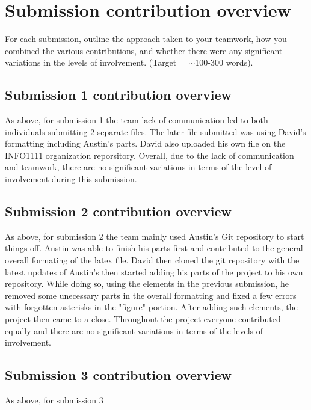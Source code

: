 \documentclass[a4paper, 11pt]{report}
\begin{document}

\newpage
\section{Submission contribution overview}

For each submission, outline the approach taken to your teamwork, how you combined the various contributions, and whether there were any significant variations in the levels of involvement. (Target = $\sim$100-300 words).

\subsection{Submission 1 contribution overview}

As above, for submission 1 the team lack of communication led to both individuals submitting 2 separate files. The later file submitted was using David's formatting including Austin's parts. David also uploaded his own file on the INFO1111 organization reporsitory. Overall, due to the lack of communication and teamwork, there are no significant variations in terms of the level of involvement during this submission. 
\subsection{Submission 2 contribution overview}


As above, for submission 2 the team mainly used Austin's Git repository to start things off. Austin was able to finish his parts first and contributed to the general overall formating of the latex file. David then cloned the git repository with the latest updates of Austin's then started adding his parts of the project to his own repository. While doing so, using the elements in the previous submission, he removed some unecessary parts in the overall formatting and fixed a few errors with forgotten asterisks in the "figure" portion. After adding such elements, the project then came to a close. Throughout the project everyone contributed equally and there are no significant variations in terms of the levels of involvement. 

\subsection{Submission 3 contribution overview}

As above, for submission 3



\newpage



\end{document}
